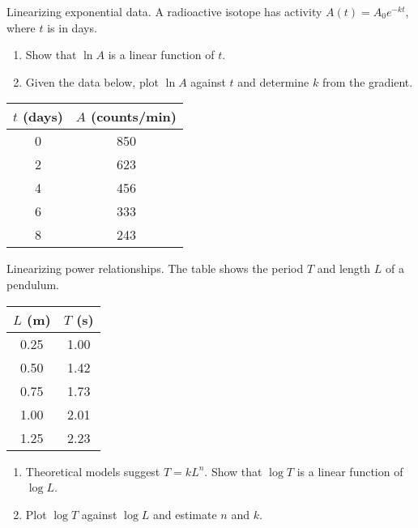 \documentclass[11pt]{article}
\def\textbf#1{#1}%
\newcounter{question}
\begin{document}
\begin{question}
\textbf{Linearizing exponential data.}
A radioactive isotope has activity $A(t)=A_0 e^{-kt}$, where $t$ is in days.
\begin{enumerate}
    \item Show that $\ln A$ is a linear function of $t$.
    \item Given the data below, plot $\ln A$ against $t$ and determine $k$ from the gradient.
\end{enumerate}

\begin{center}
\begin{tabular}{c|c}
$t$ (days) & $A$ (counts/min) \\
\hline
0 & 850 \\
2 & 623 \\
4 & 456 \\
6 & 333 \\
8 & 243
\end{tabular}
\end{center}
\end{question}

\begin{question}
\textbf{Linearizing power relationships.}
The table shows the period $T$ and length $L$ of a pendulum.

\begin{center}
\begin{tabular}{c|c}
$L$ (m) & $T$ (s) \\
\hline
0.25 & 1.00 \\
0.50 & 1.42 \\
0.75 & 1.73 \\
1.00 & 2.01 \\
1.25 & 2.23
\end{tabular}
\end{center}

\begin{enumerate}
    \item Theoretical models suggest $T=kL^n$. Show that $\log T$ is a linear function of $\log L$.
    \item Plot $\log T$ against $\log L$ and estimate $n$ and $k$.
\end{enumerate}
\end{question}
\end{document}
